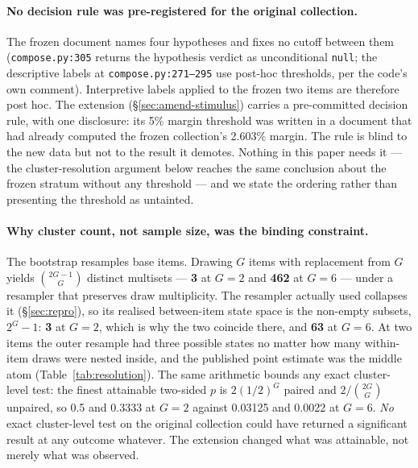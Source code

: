 \documentclass{article}
\begin{document}
\paragraph{No decision rule was pre-registered for the original collection.} The
frozen document names four hypotheses and fixes no cutoff between them
(\texttt{compose.py:305} returns the hypothesis verdict as unconditional
\texttt{null}; the descriptive labels at \texttt{compose.py:271--295} use
post-hoc thresholds, per the code's own comment). Interpretive labels applied to
the frozen two items are therefore post hoc. The extension
(\S\ref{sec:amend-stimulus}) carries a pre-committed decision rule, with one
disclosure: its 5\% margin threshold was written in a document that
had already computed the frozen collection's 2.603\% margin. The rule is
blind to the new data but not to the result it demotes. Nothing in this paper
needs it --- the cluster-resolution argument below reaches the same conclusion
about the frozen stratum without any threshold --- and we state the ordering
rather than presenting the threshold as untainted.

\paragraph{Why cluster count, not sample size, was the binding constraint.}
The bootstrap resamples base items. Drawing $G$ items with replacement from $G$
yields $\binom{2G-1}{G}$ distinct multisets --- \textbf{3} at $G=2$ and
\textbf{462} at $G=6$ --- under a resampler that preserves draw multiplicity.
The resampler actually used collapses it (\S\ref{sec:repro}), so its realised
between-item state space is the non-empty subsets, $2^G-1$: \textbf{3} at $G=2$,
which is why the two coincide there, and \textbf{63} at $G=6$. At two items the outer resample had three possible states
no matter how many within-item draws were nested inside, and the published point
estimate was the middle atom (Table~\ref{tab:resolution}). The same arithmetic
bounds any exact cluster-level test: the finest attainable two-sided $p$ is
$2(1/2)^G$ paired and $2/\binom{2G}{G}$ unpaired, so 0.5 and 0.3333 at
$G=2$ against 0.03125 and 0.0022 at $G=6$. \emph{No} exact cluster-level
test on the original collection could have returned a significant result at any
outcome whatever. The extension changed what was attainable, not merely what was
observed.
\end{document}
